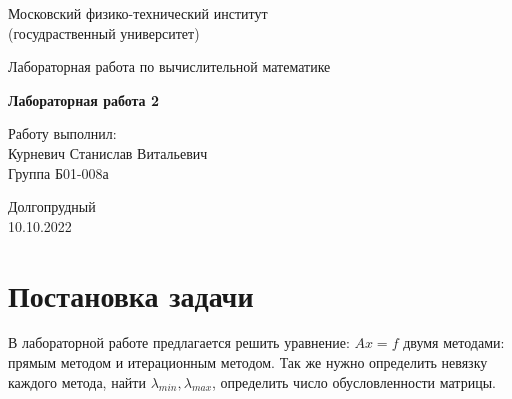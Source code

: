 \documentclass[a4paper,11.5pt]{article} %
\begin{document}
	
	
	\begin{titlepage}
		
		\newpage
		\begin{center}
			\normalsize Московский физико-технический институт \\(госудраственный 			университет)
		\end{center}
		
		\vspace{6em}
		
		\begin{center}
			\Large Лабораторная работа по вычислительной математике\\
		\end{center}
		
		\vspace{1em}
		
		\begin{center}
			\large \textbf{Лабораторная работа 2}
		\end{center}
		
		\vspace{2em}
		
		\begin{center}
			\large Работу выполнил:\\	
			Курневич Станислав Витальевич\\
			Группа Б01-008а
		\end{center}
		
		\vspace{\fill}
		
		\begin{center}
			Долгопрудный \\10.10.2022
		\end{center}
		
	\end{titlepage}
	
	
    \section{Постановка задачи}
    В лабораторной работе предлагается решить уравнение: $Ax = f$ двумя методами: прямым методом и итерационным методом. Так же нужно определить невязку каждого метода, найти $\lambda_{min}, \lambda_{max}$, определить число обусловленности матрицы.
\end{document}
